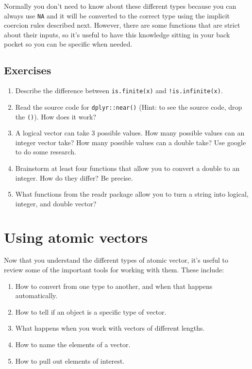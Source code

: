 \documentclass[]{book}
\begin{document}
Normally you don't need to know about these different types because you
can always use \texttt{NA} and it will be converted to the correct type
using the implicit coercion rules described next. However, there are
some functions that are strict about their inputs, so it's useful to
have this knowledge sitting in your back pocket so you can be specific
when needed.

\subsection{Exercises}\label{exercises-51}

\begin{enumerate}
\def\labelenumi{\arabic{enumi}.}
\item
  Describe the difference between \texttt{is.finite(x)} and
  \texttt{!is.infinite(x)}.
\item
  Read the source code for \texttt{dplyr::near()} (Hint: to see the
  source code, drop the \texttt{()}). How does it work?
\item
  A logical vector can take 3 possible values. How many possible values
  can an integer vector take? How many possible values can a double
  take? Use google to do some research.
\item
  Brainstorm at least four functions that allow you to convert a double
  to an integer. How do they differ? Be precise.
\item
  What functions from the readr package allow you to turn a string into
  logical, integer, and double vector?
\end{enumerate}

\section{Using atomic vectors}\label{using-atomic-vectors}

Now that you understand the different types of atomic vector, it's
useful to review some of the important tools for working with them.
These include:

\begin{enumerate}
\def\labelenumi{\arabic{enumi}.}
\item
  How to convert from one type to another, and when that happens
  automatically.
\item
  How to tell if an object is a specific type of vector.
\item
  What happens when you work with vectors of different lengths.
\item
  How to name the elements of a vector.
\item
  How to pull out elements of interest.
\end{enumerate}
\end{document}
